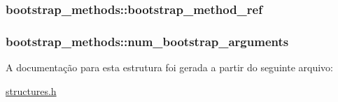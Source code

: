 \subsubsection[{\texorpdfstring{bootstrap\+\_\+method\+\_\+ref}{bootstrap_method_ref}}]{ bootstrap\+\_\+methods\+::bootstrap\+\_\+method\+\_\+ref}\hypertarget{structbootstrap__methods_a480411f5ca41d770aa9ce24ee7e8e1e8}{}\label{structbootstrap__methods_a480411f5ca41d770aa9ce24ee7e8e1e8}
\subsubsection[{\texorpdfstring{num\+\_\+bootstrap\+\_\+arguments}{num_bootstrap_arguments}}]{ bootstrap\+\_\+methods\+::num\+\_\+bootstrap\+\_\+arguments}\hypertarget{structbootstrap__methods_aad28739e25a094400551fd1080fdb1f6}{}\label{structbootstrap__methods_aad28739e25a094400551fd1080fdb1f6}


A documentação para esta estrutura foi gerada a partir do seguinte arquivo\+:\begin{DoxyCompactItemize}
\item 
\hyperlink{structures_8h}{structures.\+h}\end{DoxyCompactItemize}
